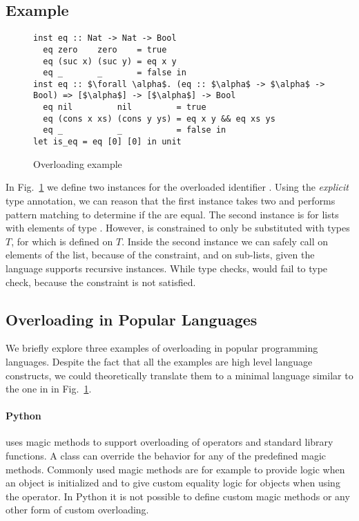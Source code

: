 \documentclass[runningheads]{llncs}
\newcommand{\snip}[1]{\footnotesize{\ttfamily{#1}}}
\begin{document}
\subsection{Example}
  \begin{figure}
    \begin{lstlisting}
inst eq :: Nat -> Nat -> Bool
  eq zero    zero    = true
  eq (suc x) (suc y) = eq x y
  eq _       _       = false in
inst eq :: $\forall \alpha$. (eq :: $\alpha$ -> $\alpha$ -> Bool) => [$\alpha$] -> [$\alpha$] -> Bool
  eq nil         nil         = true
  eq (cons x xs) (cons y ys) = eq x y && eq xs ys
  eq _           _           = false in
let is_eq = eq [0] [0] in unit
    \end{lstlisting}
  \caption{Overloading example} \label{example}
  \end{figure}
\noindent 
In Fig.~\ref{example} we define two instances for the overloaded identifier \snip{eq}. 
Using the \emph{explicit} type annotation, we can reason that the first instance takes two \snip{Nat} and performs pattern matching to determine if the are equal. 
The second instance is for lists with elements of type \snip{$\alpha$}. 
However, \snip{$\alpha$} is constrained to only be substituted with types $T$, for which \snip{eq} is defined on $T$.
Inside the second instance we can safely call \snip{eq} on elements of the list, because of the constraint, and on sub-lists, given the language supports recursive instances. 
While \snip{eq [0] [0]} type checks, \snip{eq [true] [true]} would fail to type check, because the constraint is not satisfied.

\subsection{Overloading in Popular Languages}
We briefly explore three examples of overloading in popular programming languages. 
Despite the fact that all the examples are high level language constructs, we could theoretically translate them to a minimal language similar to the one in in Fig.~\ref{example}. 
\paragraph{Python} uses magic methods to support overloading of operators and standard library functions. 
A class can override the behavior for any of the predefined magic methods.
Commonly used magic methods are for example \snip{\_\_init\_\_(self)} to provide logic when an object is initialized and \snip{\_\_eq\_\_(self, other)} to give custom equality logic for objects when using the \snip{==} operator. 
In Python it is not possible to define custom magic methods or any other form of custom overloading.
\end{document}
